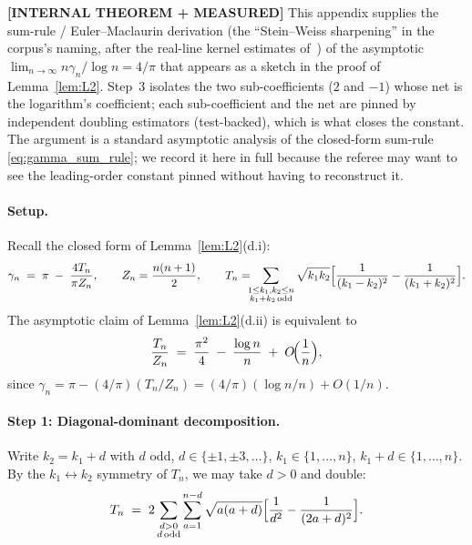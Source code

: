 \documentclass[11pt,a4paper]{article}
\theoremstyle{plain}
\theoremstyle{definition}
\begin{document}
\textbf{[INTERNAL THEOREM + MEASURED]} This appendix supplies the
sum-rule / Euler--Maclaurin derivation (the ``Stein--Weiss
sharpening'' in the corpus's naming, after the real-line kernel
estimates of~\cite{stein_weiss1971}) of the asymptotic
$\lim_{n\to\infty} n\gamma_n / \log n = 4/\pi$ that appears as a
sketch in the proof of Lemma~\ref{lem:L2}. Step~3 isolates the two
sub-coefficients ($2$ and $-1$) whose net is the logarithm's
coefficient; each sub-coefficient and the net are pinned by
independent doubling estimators (test-backed), which is what closes
the constant. The argument is a standard asymptotic analysis of the
closed-form sum-rule \eqref{eq:gamma_sum_rule}; we record it here in
full because the referee may want to see the leading-order constant
pinned without having to reconstruct it.

\paragraph{Setup.}
Recall the closed form of Lemma~\ref{lem:L2}(d.i):
\begin{equation}\label{eq:gamma_closed_form_repeat}
   \gamma_n \;=\; \pi \;-\; \frac{4 T_n}{\pi Z_n}, \qquad
   Z_n = \frac{n(n+1)}{2}, \qquad
   T_n = \!\!\!\sum_{\substack{1\le k_1, k_2 \le n \\ k_1 + k_2\,\mathrm{odd}}}
                \sqrt{k_1 k_2}\Bigl[\frac{1}{(k_1-k_2)^2} - \frac{1}{(k_1+k_2)^2}\Bigr].
\end{equation}
The asymptotic claim of Lemma~\ref{lem:L2}(d.ii) is equivalent to
\begin{equation}\label{eq:Tn_asymptotic}
   \frac{T_n}{Z_n} \;=\; \frac{\pi^2}{4} \;-\; \frac{\log n}{n}
   \;+\; O\!\Bigl(\frac{1}{n}\Bigr),
\end{equation}
since $\gamma_n = \pi - (4/\pi)(T_n/Z_n) =
(4/\pi)(\log n / n) + O(1/n)$.

\paragraph{Step 1: Diagonal-dominant decomposition.}
Write $k_2 = k_1 + d$ with $d$ odd, $d \in \{\pm 1, \pm 3, \ldots\}$,
$k_1 \in \{1, \ldots, n\}$, $k_1 + d \in \{1, \ldots, n\}$. By the
$k_1 \leftrightarrow k_2$ symmetry of $T_n$, we may take $d > 0$ and
double:
\begin{equation*}
   T_n \;=\; 2 \sum_{\substack{d > 0 \\ d\,\mathrm{odd}}}
   \sum_{a=1}^{n-d}
   \sqrt{a(a+d)}\Bigl[\frac{1}{d^2} - \frac{1}{(2a+d)^2}\Bigr].
\end{equation*}
\end{document}
